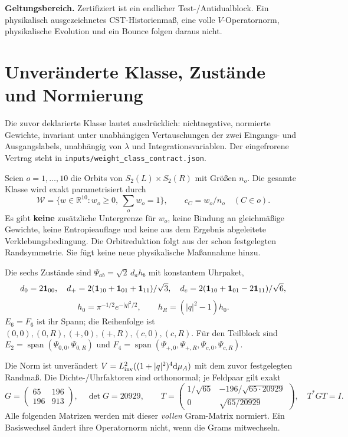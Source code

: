 \documentclass[10pt,a4paper]{article}
\newcommand{\W}{\mathcal W}\newcommand{\dd}{\mathrm d}
\begin{document}
\textbf{Geltungsbereich.} Zertifiziert ist ein endlicher Test-/Antidualblock.
Ein physikalisch ausgezeichnetes CST-Historienmaß, eine volle
$V$-Operatornorm, physikalische Evolution und ein Bounce folgen daraus nicht.

\newpage
\section{Unveränderte Klasse, Zustände und Normierung}
Die zuvor deklarierte Klasse lautet ausdrücklich: nichtnegative, normierte
Gewichte, invariant unter unabhängigen Vertauschungen der zwei Eingangs-
und Ausgangslabels, unabhängig von $\lambda$ und Integrationsvariablen.
Der eingefrorene Vertrag steht in \texttt{inputs/weight\_class\_contract.json}.

Seien $o=1,\ldots,10$ die Orbits von $S_2(L)\times S_2(R)$ mit Größen $n_o$.
Die gesamte Klasse wird exakt parametrisiert durch
\[
 \W=\{w\in\mathbb R^{10}:w_o\geq0,\ \sum_o w_o=1\},\qquad
 c_C=w_o/n_o\quad(C\in o).
\]
Es gibt \textbf{keine} zusätzliche Untergrenze für $w_o$, keine Bindung an
gleichmäßige Gewichte, keine Entropieauflage und keine aus dem Ergebnis
abgeleitete Verklebungsbedingung. Die Orbitreduktion folgt aus der schon
festgelegten Randsymmetrie. Sie fügt keine neue physikalische Maßannahme hinzu.

Die sechs Zustände sind $\Psi_{ab}=\sqrt2\,d_a h_b$ mit konstantem Uhrpaket,
\[
 d_0=2\mathbf1_{00},\quad d_+=2(\mathbf1_{10}+\mathbf1_{01}+\mathbf1_{11})/\sqrt3,\quad
 d_c=2(\mathbf1_{10}+\mathbf1_{01}-2\mathbf1_{11})/\sqrt6,
\]
\[
 h_0=\pi^{-1/2}e^{-|q|^2/2},\qquad h_R=(|q|^2-1)h_0.
\]
$E_6=F_6$ ist ihr Spann; die Reihenfolge ist $(0,0),(0,R),(+,0),(+,R),(c,0),(c,R)$.
Für den Teilblock sind $E_2=\operatorname{span}(\Psi_{0,0},\Psi_{0,R})$
und $F_4=\operatorname{span}(\Psi_{+,0},\Psi_{+,R},\Psi_{c,0},\Psi_{c,R})$.

Die Norm ist unverändert $V=L^2_{\rm inv}((1+|q|^2)^4\dd\mu_A)$ mit dem
zuvor festgelegten Randmaß. Die Dichte-/Uhrfaktoren sind orthonormal; je
Feldpaar gilt exakt
\[
 G=\begin{pmatrix}65&196\\196&913\end{pmatrix},\quad \det G=20929,\qquad
 T=\begin{pmatrix}1/\sqrt{65}&-196/\sqrt{65\cdot20929}\\
 0&\sqrt{65/20929}\end{pmatrix},\quad T^*GT=I.
\]
Alle folgenden Matrizen werden mit dieser \emph{vollen} Gram-Matrix normiert.
Ein Basiswechsel ändert ihre Operatornorm nicht, wenn die Grams mitwechseln.
\end{document}
